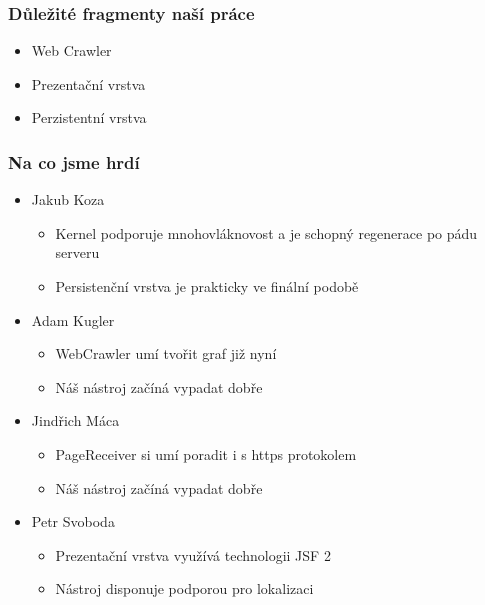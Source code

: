 \documentclass{beamer}
\begin{document}
\begin{frame}[allowframebreaks]\frametitle{Důležité fragmenty naší práce}
  \begin{itemize}
    \item Web Crawler
		\item Prezentační vrstva
		\item Perzistentní vrstva
  \end{itemize}
\end{frame}

\begin{frame}[allowframebreaks]\frametitle{Na co jsme hrdí} 
  \begin{itemize}
    \item Jakub Koza
      \begin{itemize}
				\item Kernel podporuje mnohovláknovost a je schopný regenerace po pádu serveru
				\item Persistenční vrstva je prakticky ve finální podobě
     \end{itemize}
   
    \item Adam Kugler
      \begin{itemize}
				\item WebCrawler umí tvořit graf již nyní
				\item Náš nástroj začíná vypadat dobře
     \end{itemize}

    \item Jindřich Máca
      \begin{itemize}
        \item PageReceiver si umí poradit i s https protokolem
				\item Náš nástroj začíná vypadat dobře
      \end{itemize}  
   
    \item Petr Svoboda
      \begin{itemize}
				\item Prezentační vrstva využívá technologii JSF 2
				\item Nástroj disponuje podporou pro lokalizaci
     \end{itemize}
   \end{itemize}  
\end{frame}
\end{document}
